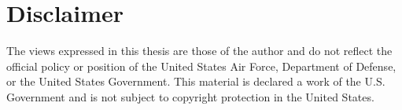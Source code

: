 \documentclass[twocolumn,10pt,final]{asme2ej}
\begin{document}
\vspace{-0.3 cm}
\section*{Disclaimer}
The views expressed in this thesis are those of the author and do not reflect the official policy or position of the United States Air Force, Department of Defense, or the United States Government.  This material is declared a work of the U.S. Government and is not subject to copyright protection in the United States.



\vspace{-0.3 cm}








\end{document}
